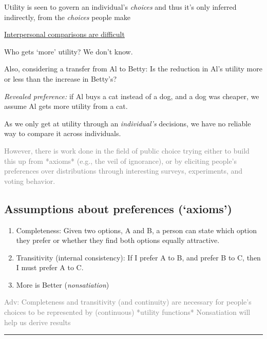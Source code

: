 \documentclass[]{article}
\begin{document}
Utility is seen to govern an individual's \emph{choices} and thus it's
only inferred indirectly, from the \emph{choices} people make

\bigskip

\underline{Interpersonal comparisons are difficult}

Who gets `more' utility? We don't know.

Also, considering a transfer from Al to Betty: Is the reduction in Al's
utility more or less than the increase in Betty's?

\emph{Revealed preference:} if Al buys a cat instead of a dog, and a dog
was cheaper, we assume Al gets more utility from a cat.

As we only get at utility through an \emph{individual's} decisions, we
have no reliable way to compare it across individuals.

\textcolor{gray}{However, there is work done in the field of public choice trying either to build this up from *axioms* (e.g., the veil of ignorance),
or by eliciting people's preferences over distributions through interesting surveys, experiments, and voting behavior.}

\hypertarget{assumptions-about-preferences-axioms}{%
\subsection{Assumptions about preferences
(`axioms')}\label{assumptions-about-preferences-axioms}}

\begin{enumerate}
\def\labelenumi{\arabic{enumi}.}
\item
  Completeness: Given two options, A and B, a person can state which
  option they prefer or whether they find both options equally
  attractive.
\item
  Transitivity (internal consistency): If I prefer A to B, and prefer B
  to C, then I must prefer A to C.
\item
  More is Better (\emph{nonsatiation})
\end{enumerate}

\textcolor{gray}{Adv: Completeness and transitivity (and continuity)  are necessary for people's choices to be represented by (continuous) *utility functions*
Nonsatiation will help us derive results}

\begin{center}\rule{0.5\linewidth}{\linethickness}\end{center}
\end{document}
